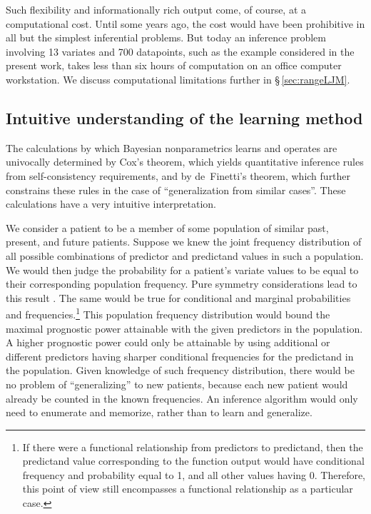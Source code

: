 \documentclass[a4paper,12pt,%
onecolumn,oneside,article,%
british%
]{memoir}
\theoremstyle{remark}
\theoremstyle{innote}
\renewcommand*{\|}[1][]{\nonscript\:#1\vert\nonscript\:\mathopen{}}
\newcommand*{\sect}{\S}%
\newcommand*{\sects}{\S\S}%
\begin{document}
Such flexibility and informationally rich output come, of course, at a computational cost. Until some years ago, the cost would have been prohibitive in all but the simplest inferential problems. But today an inference problem involving 13 variates and 700 datapoints, such as the example considered in the present work, takes less than six hours of computation on an office computer workstation. We discuss computational limitations further in \sect\,\ref{sec:rangeLJM}.

\subsection{Intuitive understanding of the learning method}
\label{sec:the_machine_learning}

The calculations by which Bayesian nonparametrics learns and operates are univocally determined by Cox's theorem\autocites{cox1946,cox1961,polya1954,polya1954b_r1968,tribus1969,fine1973,rosenkrantz1977,paris1994_r2006,snow1998,halpern1999b,arnborgetal2001,snow2001,claytonetal2017}[see also][]{hailperin1996}[for a review]{vanhorn2003}, which yields quantitative inference rules from self-consistency requirements, and by de~Finetti's theorem\autocites[\sects~4.2--4.3]{definetti1930,definetti1937,bernardoetal1994_r2000}[for a review see][]{dawid2013}, which further constrains these rules in the case of \enquote{generalization from similar cases}. These calculations have a very intuitive interpretation.

We consider a patient to be a member of some population of similar past, present, and future patients. Suppose we knew the joint frequency distribution of all possible combinations of predictor and predictand values in such a population. We would then judge the probability for a patient's variate values to be equal to their corresponding population frequency. Pure symmetry considerations lead to this result \autocites[Appendix on eduction]{johnson1924}[\sects~4.2--4.3]{johnson1932c,definetti1930,dawid2013,bernardoetal1994_r2000}. The same would be true for conditional and marginal probabilities and frequencies.\footnote{If there were a functional relationship from predictors to predictand, then the predictand value corresponding to the function output would have conditional frequency and probability equal to 1, and all other values having 0. Therefore, this point of view still encompasses a functional relationship as a particular case.} This population frequency distribution would bound the maximal prognostic power attainable with the given predictors in the population. A higher prognostic power could only be attainable by using additional or different predictors having sharper conditional frequencies for the predictand in the population. Given knowledge of such frequency distribution, there would be no problem of \enquote{generalizing} to new patients, because each new patient would already be counted in the known frequencies. An inference algorithm would only need to enumerate and memorize, rather than to learn and generalize.
\end{document}
